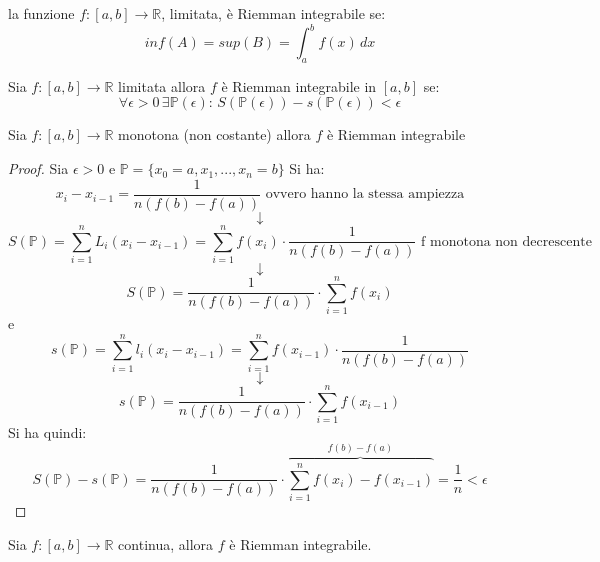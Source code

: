 \documentclass[a4paper,12pt, oneside]{book}
\begin{document}
\begin{definizione}
	la funzione $f:[a,b]\rightarrow\mathbb{R}$, limitata, è Riemman integrabile se:$$inf(A)=sup(B)=\int_{a}^{b}f(x)\,dx$$
\end{definizione}
\newpage
\begin{teorema}
	Sia $f:[a,b]\rightarrow\mathbb{R}$ limitata allora $f$ è Riemman integrabile in $[a,b]$ se:
	$$\forall\epsilon>0	\, \exists\mathbb{P}(\epsilon):\, S(\mathbb{P}(\epsilon))-s(\mathbb{P}(\epsilon))<\epsilon$$
\end{teorema}
\begin{teorema}
	Sia $f:[a,b]\rightarrow\mathbb{R}$ monotona (non costante) allora $f$ è Riemman integrabile
\end{teorema}
\begin{proof}
	Sia $\epsilon>0$ e $\mathbb{P}=\{x_0=a,x_1,...,x_n=b\}$ Si ha:
	$$x_i-x_{i-1}=\frac{1}{n(f(b)-f(a))} \mbox{ ovvero hanno la stessa ampiezza}$$
	$$\downarrow$$
	$$S(\mathbb{P})= \sum_{i=1}^{n} L_i(x_i-x_{i-1})=\sum_{i=1}^{n}f(x_i)\cdot \frac{1}{n(f(b)-f(a))} \mbox{ f monotona non decrescente}$$
	$$\downarrow$$
	$$S(\mathbb{P})=\frac{1}{n(f(b)-f(a))}\cdot\sum_{i=1}^{n}f(x_i)$$
	e
	$$s(\mathbb{P})= \sum_{i=1}^{n} l_i(x_i-x_{i-1})=\sum_{i=1}^{n}f(x_{i-1})\cdot \frac{1}{n(f(b)-f(a))}$$
	$$\downarrow$$
	$$s(\mathbb{P})=\frac{1}{n(f(b)-f(a))}\cdot\sum_{i=1}^{n}f(x_{i-1})$$
	Si ha quindi:
	$$S(\mathbb{P})-s(\mathbb{P})=\frac{1}{n(f(b)-f(a))}\cdot\overbrace{\sum_{i=1}^{n}f(x_i)-f(x_{i-1})}^{f(b)-f(a)}=\frac{1}{n}<\epsilon$$
\end{proof}
\begin{teorema}
	Sia $f:[a,b]\rightarrow\mathbb{R}$ continua, allora $f$ è Riemman integrabile.
\end{teorema}
\newpage
\end{document}
